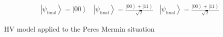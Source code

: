 \documentclass[british,aps,prl,superscriptaddress,nofootinbib,times,reprint]{revtex4-1}
\theoremstyle{plain}
\theoremstyle{plain}
\theoremstyle{definition}
\theoremstyle{remark}
\theoremstyle{remark}
\theoremstyle{remark}
\theoremstyle{plain}
\theoremstyle{plain}
\theoremstyle{plain}
\theoremstyle{definition}
\theoremstyle{definition}
\begin{document}
\begin{table}
\begin{equation*}
\begin{array}{ccc}
\left|\psi_{\text{final}}\right\rangle = \left|00\right\rangle  & \left|\psi_{\text{final}}\right\rangle = \frac{\left|00\right\rangle +\left|11\right\rangle}{\sqrt{2}} & \left|\psi_{\text{final}}\right\rangle = \frac{\left|00\right\rangle+\left|11\right\rangle }{\sqrt{2}}


\label{eq:toyModel}
\end{array}
\end{equation*}
\caption{HV model applied to the Peres Mermin situation}
\label{tbl:HVmodel}
\end{table}
\end{document}
